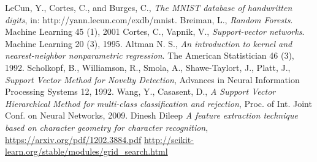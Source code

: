 \documentclass{article}
\begin{document}
\newpage
\begin{thebibliography}{9}
	 LeCun, Y., Cortes, C., and Burges, C., \emph{The MNIST database of handwritten digits}, in: http://yann.lecun.com/exdb/mnist.
	 Breiman, L., \emph{Random Forests}. Machine Learning 45 (1), 2001
	 Cortes, C., Vapnik, V., \emph{Support-vector networks}. Machine Learning 20 (3), 1995.	
	 Altman N. S., \emph{An introduction to kernel and nearest-neighbor nonparametric regression}. The American Statistician 46 (3), 1992.
     Scholkopf, B., Williamson, R., Smola, A., Shawe-Taylort, J., Platt, J., \emph{Support Vector Method for Novelty Detection}, Advances in Neural Information Processing Systems 12, 1992. 
     Wang, Y., Casasent, D., \emph{A Support Vector Hierarchical Method for multi-class classification and rejection}, Proc. of Int. Joint Conf. on Neural Networks, 2009.
     Dinesh Dileep \emph{A feature extraction technique based on character geometry for character recognition}, \href{https://arxiv.org/pdf/1202.3884.pdf}{https://arxiv.org/pdf/1202.3884.pdf}
     \href{http://scikit-learn.org/stable/modules/grid\_search.html}{http://scikit-learn.org/stable/modules/grid\_search.html}


\end{thebibliography}
\end{document}
